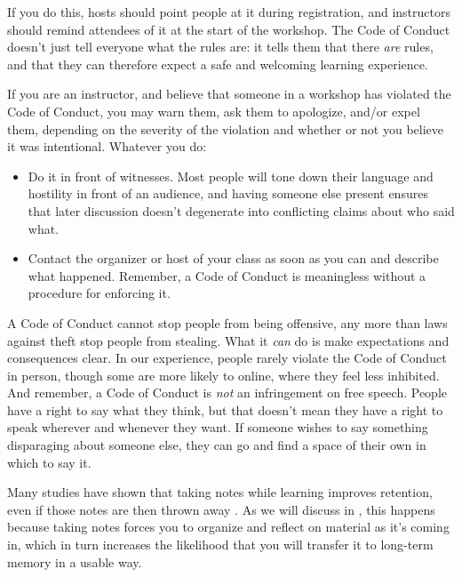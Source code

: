 If you do this, hosts should point people at it during registration,
and instructors should remind attendees of it at the start of the
workshop. The Code of Conduct doesn't just tell everyone what the
rules are: it tells them that there \emph{are} rules, and that they
can therefore expect a safe and welcoming learning experience.

If you are an instructor, and believe that someone in a workshop has
violated the Code of Conduct, you may warn them, ask them to
apologize, and/or expel them, depending on the severity of the
violation and whether or not you believe it was intentional.  Whatever
you do:

\begin{itemize}

\item
  Do it in front of witnesses.  Most people will tone down their
  language and hostility in front of an audience, and having someone
  else present ensures that later discussion doesn't degenerate into
  conflicting claims about who said what.

\item
  Contact the organizer or host of your class as soon as you can and
  describe what happened.  Remember, a Code of Conduct is meaningless
  without a procedure for enforcing it.

\end{itemize}

A Code of Conduct cannot stop people from being offensive, any more
than laws against theft stop people from stealing. What it \emph{can}
do is make expectations and consequences clear.  In our experience,
people rarely violate the Code of Conduct in person, though some are
more likely to online, where they feel less inhibited.  And remember,
a Code of Conduct is \emph{not} an infringement on free speech.
People have a right to say what they think, but that doesn't mean they
have a right to speak wherever and whenever they want.  If someone
wishes to say something disparaging about someone else, they can go
and find a space of their own in which to say it.


Many studies have shown that taking notes while learning improves
retention, even if those notes are then thrown away \cite{fixme}.  As
we will discuss in , this happens because taking
notes forces you to organize and reflect on material as it's coming
in, which in turn increases the likelihood that you will transfer it
to long-term memory in a usable way.

